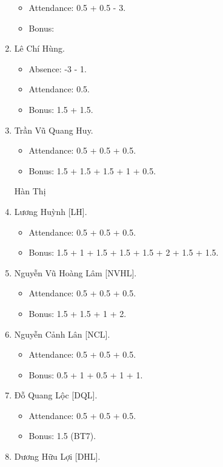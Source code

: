 \documentclass{article}
\begin{document}
\begin{enumerate}
    \begin{itemize}
        \item Attendance: 0.5 + 0.5 - 3.
        \item Bonus:
    \end{itemize}
    \item {\sc Lê Chí Hùng.}
    \begin{itemize}
        \item Absence: -3 - 1.
        \item Attendance: 0.5.
        \item Bonus: 1.5 + 1.5.
    \end{itemize}
    \item {\sc Trần Vũ Quang Huy.}
    \begin{itemize}
        \item Attendance: 0.5 + 0.5 + 0.5.
        \item Bonus: 1.5 + 1.5 + 1.5 + 1 + 0.5.
    \end{itemize}Hàn Thị
    \item {\sc Lương Huỳnh [LH].}
    \begin{itemize}
        \item Attendance: 0.5 + 0.5 + 0.5.
        \item Bonus: 1.5 + 1 + 1.5 + 1.5 + 1.5 + 2 + 1.5 + 1.5.
    \end{itemize}
    \item {\sc Nguyễn Vũ Hoàng Lâm [NVHL].}
    \begin{itemize}
        \item Attendance: 0.5 + 0.5 + 0.5.
        \item Bonus: 1.5 + 1.5 + 1 + 2.
    \end{itemize}
    \item {\sc Nguyễn Cảnh Lân [NCL].}
    \begin{itemize}
        \item Attendance: 0.5 + 0.5 + 0.5.
        \item Bonus: 0.5 + 1 + 0.5 + 1 + 1.
    \end{itemize}
    \item {\sc Đỗ Quang Lộc [DQL].}
    \begin{itemize}
        \item Attendance: 0.5 + 0.5 + 0.5.
        \item Bonus: 1.5 (BT7).
    \end{itemize}
    \item {\sc Dương Hữu Lợi [DHL].}
    \begin{itemize}

\end{itemize}
\end{enumerate}
\end{document}
